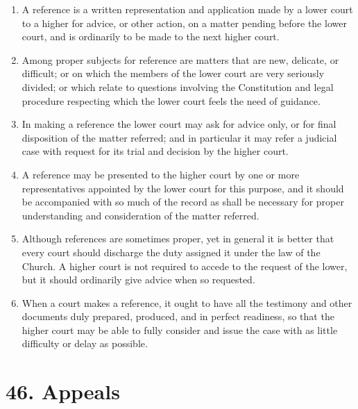 \documentclass[
]{book}
\providecommand{\tightlist}{%
  \setlength{\itemsep}{0pt}\setlength{\parskip}{0pt}}
\begin{document}
\begin{enumerate}
\def\labelenumi{\arabic{enumi}.}
\tightlist
\item
  \protect\hypertarget{45}{\href{}{}}A reference is a written representation and application made by a lower court to a higher for advice, or other action, on a matter pending before the lower court, and is ordinarily to be made to the next higher court.
\item
  Among proper subjects for reference are matters that are new, delicate, or difficult; or on which the members of the lower court are very seriously divided; or which relate to questions involving the Constitution and legal procedure respecting which the lower court feels the need of guidance.
\item
  \protect\hypertarget{45.3}{\href{}{}}In making a reference the lower court may ask for advice only, or for final disposition of the matter referred; and in particular it may refer a judicial case with request for its trial and decision by the higher court.
\item
  A reference may be presented to the higher court by one or more representatives appointed by the lower court for this purpose, and it should be accompanied with so much of the record as shall be necessary for proper understanding and consideration of the matter referred.
\item
  Although references are sometimes proper, yet in general it is better that every court should discharge the duty assigned it under the law of the Church. A higher court is not required to accede to the request of the lower, but it should ordinarily give advice when so requested.
\item
  When a court makes a reference, it ought to have all the testimony and other documents duly prepared, produced, and in perfect readiness, so that the higher court may be able to fully consider and issue the case with as little difficulty or delay as possible.
\end{enumerate}

\hypertarget{appeals}{%
\section*{46. Appeals}\label{appeals}}

\protect\hypertarget{chapter-slug-46-appeals}{\href{}{}}
\end{document}
